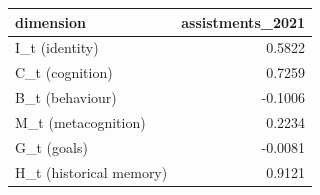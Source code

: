 \begin{tabular}{lr}
\toprule
dimension & assistments\_2021 \\
\midrule
I\_t (identity) & 0.5822 \\
C\_t (cognition) & 0.7259 \\
B\_t (behaviour) & -0.1006 \\
M\_t (metacognition) & 0.2234 \\
G\_t (goals) & -0.0081 \\
H\_t (historical memory) & 0.9121 \\
\bottomrule
\end{tabular}
